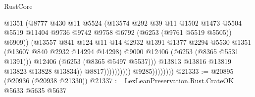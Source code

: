 \begin{lexlean}{RustCore}
\begin{coremodule}
                                              @1351
                                              (@8777
                                                @430
                                                @11
                                                @5524
                                                (@13574
                                                  @292
                                                  @39
                                                  @11
                                                  @1502
                                                  @1473
                                                  @5504
                                                  @5519
                                                  @11404
                                                  @9736
                                                  @9742
                                                  @9758
                                                  @6792
                                                  (@6253 (@9761 @5519 @5505))
                                                  @6909))
                                              (@13557
                                                @841
                                                @124
                                                @11
                                                @14
                                                @2932
                                                @1391
                                                @1377
                                                @2294
                                                @5530
                                                @1351
                                                (@13607 @840 @2932 @14294 @14298)
                                                @9000
                                                @12406
                                                (@6253 (@8365 @5531 @1391)))
                                              @12406
                                              (@6253 (@8365 @5497 @5537)))
                                            @13813
                                            @13816
                                            @13819
                                            @13823
                                            @13828
                                            @13834))
                                        @8817))))))))))
                    @9285))))))))
@21333 := @20895 (@20936 (@20938 @21330))
@21337 := LexLeanPreservation.Rust.CrateOK @5633 @5635 @5637

\end{coremodule}
\end{lexlean}
